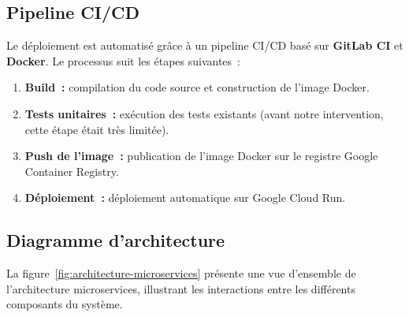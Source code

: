 \subsection{Pipeline CI/CD}
\label{subsec:pipeline-cicd}

Le déploiement est automatisé grâce à un pipeline CI/CD basé sur \textbf{GitLab CI} et \textbf{Docker}. Le processus suit les étapes suivantes~:

\begin{enumerate}
    \item \textbf{Build~:} compilation du code source et construction de l'image Docker.
    \item \textbf{Tests unitaires~:} exécution des tests existants (avant notre intervention, cette étape était très limitée).
    \item \textbf{Push de l'image~:} publication de l'image Docker sur le registre Google Container Registry.
    \item \textbf{Déploiement~:} déploiement automatique sur Google Cloud Run.
\end{enumerate}

\subsection{Diagramme d'architecture}
\label{subsec:diagramme-architecture}

La figure~\ref{fig:architecture-microservices} présente une vue d'ensemble de l'architecture microservices, illustrant les interactions entre les différents composants du système.

